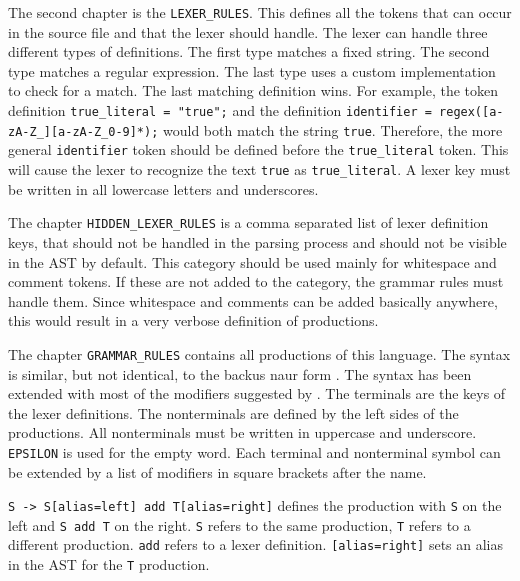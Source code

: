 The second chapter is the \verb|LEXER_RULES|. 
This defines all the tokens that can occur in the source file and that the lexer should handle. 
The lexer can handle three different types of definitions. 
The first type matches a fixed string. The second type matches a regular expression. 
The last type uses a custom implementation to check for a match. 
The last matching definition wins. 
For example, the token definition \verb|true_literal = "true";| and the definition \verb|identifier = regex([a-zA-Z_][a-zA-Z_0-9]*);| would both match the string \verb|true|. 
Therefore, the more general \verb|identifier| token should be defined before the \verb|true_literal| token. 
This will cause the lexer to recognize the text \verb|true| as \verb|true_literal|. 
A lexer key must be written in all lowercase letters and underscores.

The chapter \verb|HIDDEN_LEXER_RULES| is a comma separated list of lexer definition keys, 
that should not be handled in the parsing process and should not be visible in the AST by default.
This category should be used mainly for whitespace and comment tokens. If these are not added to the category, the grammar rules must handle them.
Since whitespace and comments can be added basically anywhere, this would result in a very verbose definition of productions.

The chapter \verb|GRAMMAR_RULES| contains all productions of this language. The syntax is similar, but not identical, to the backus naur form \cite{AhoLSU2006}. 
The syntax has been extended with most of the modifiers suggested by \cite{GeneratingRewritableAST}. 
The terminals are the keys of the lexer definitions.
The nonterminals are defined by the left sides of the productions. 
All nonterminals must be written in uppercase and underscore. 
\verb|EPSILON| is used for the empty word. 
Each terminal and nonterminal symbol can be extended by a list of modifiers in square brackets after the name. 

\verb|S -> S[alias=left] add T[alias=right]| defines the production with \verb|S| on the left and \verb|S add T| on the right. 
\verb|S| refers to the same production, \verb|T| refers to a different production. 
\verb|add| refers to a lexer definition. 
\verb|[alias=right]| sets an alias in the AST for the \verb|T| production.
